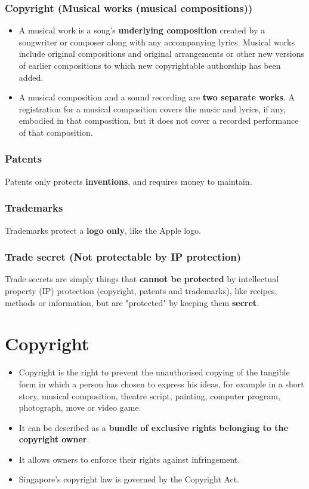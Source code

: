 \documentclass[11pt]{article}
\begin{document}
\clearpage
\subsubsection{Copyright (Musical works (musical compositions))}
\label{sec:orgb37ce5b}
\begin{itemize}
\item A musical work is a song's \textbf{underlying composition} created by a songwriter or composer along with any accompanying lyrics. Musical works include original compositions and original arrangements or other new versions of earlier compositions to which new copyrightable authorship has been added.
\item A musical composition and a sound recording are \textbf{two separate works}. A registration for a musical composition covers the music and lyrics, if any, embodied in that composition, but it does not cover a recorded performance of that composition.
\end{itemize}
\subsubsection{Patents}
\label{sec:orgf2615ea}
Patents only protects \textbf{inventions}, and requires money to maintain.
\subsubsection{Trademarks}
\label{sec:org60511de}
Trademarks protect a \textbf{logo only}, like the Apple logo.
\subsubsection{Trade secret (Not protectable by IP protection)}
\label{sec:org4930636}
Trade secrets are simply things that \textbf{cannot be protected} by intellectual property (IP) protection (copyright, patents and trademarks), like recipes, methods or information, but are "protected" by keeping them \textbf{secret}.
\section{Copyright}
\label{sec:orgdff9ffa}
\begin{itemize}
\item Copyright is the right to prevent the unauthorised copying of the tangible form in which a person has chosen to express his ideas, for example in a short story, musical composition, theatre script, painting, computer program, photograph, move or video game.
\item It can be described as a \textbf{bundle of exclusive rights belonging to the copyright owner}.
\item It allows owners to enforce their rights against infringement.
\item Singapore's copyright law is governed by the Copyright Act.
\end{itemize}
\end{document}
